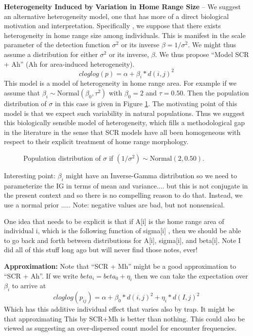 {\bf Heterogeneity Induced by Variation in Home Range Size} -- We suggest an alternative heterogeneity model, one that has more of a direct biological motivation and interpretation. Specifically , we suppose that there exists heterogeneity in home range size among individuals. This is manifest in the scale parameter of the detection function $\sigma^{2}$ or its inverse $\beta = 1/\sigma^{2}$. We might
thus assume a distribution for either $\sigma^{2}$ or its inverse,
$\beta$.  We thus propose ``Model SCR + Ah'' (Ah for area-induced
heterogeneity).
\[
 cloglog(p) = \alpha + \beta_{i}*d(i,j)^2
\]
This model is a model of heterogeneity in home range area. For example
if we assume that $\beta_{i} \sim \mbox{Normal}(\beta_0,\tau^{2})$
with $\beta_{0} = 2$ and $\tau = 0.50$. Then the population
distribution of $\sigma$ in this case is given in Figure
\ref{fig.one}. The motivating point of this model is that we expect
such variability in natural populations. Thus we suggest this
biologically sensible model of heterogeneity, which fills a
methodological gap in the literature in the sense that SCR models have
all been homogeneous with respect to their explicit treatment of home
range morphology.

\begin{figure}[ht]
\caption{
Population distribution of $\sigma$ if $(1/\sigma^{2}) \sim \mbox{Normal}(2, 0.50)$.
}
\label{fig.one}
\end{figure}

Interesting point: $\beta_{i}$ might have an Inverse-Gamma
distribution so we need to parameterize the IG in terms of mean and
variance.... but this is not conjugate in the present context and so
there is no compelling reason to do that. Instead, we use a normal
prior ..... Note: negative values are bad, but not nonsensical.

One idea that needs to be explicit is that if A[i] is the home range
area of individual i, which is the following function of sigma[i] ,
then we should be able to go back and forth between distributions for
A[i], sigma[i], and beta[i]. Note I did all of this stuff long ago but
will never find those notes, ever!

{\bf Approximation: }
Note that ``SCR + Mh'' might be a good approximation to ``SCR + Ah''.  If we write $beta_{i} =
beta_{0} + \eta_{i}$ then
we can take the expectation over  $\beta_{i}$ to arrive at
\[
 cloglog(p_{ij} ) = \alpha + \beta_{0}*d(i,j)^2 +  \eta_{i}*d(I,j)^2
\]
Which has this additive individual effect that varies also by trap. It might be that approximating
This by SCR+Mh is better than nothing.
This could also be viewed as suggesting an over-dispersed count model for encounter frequencies.

